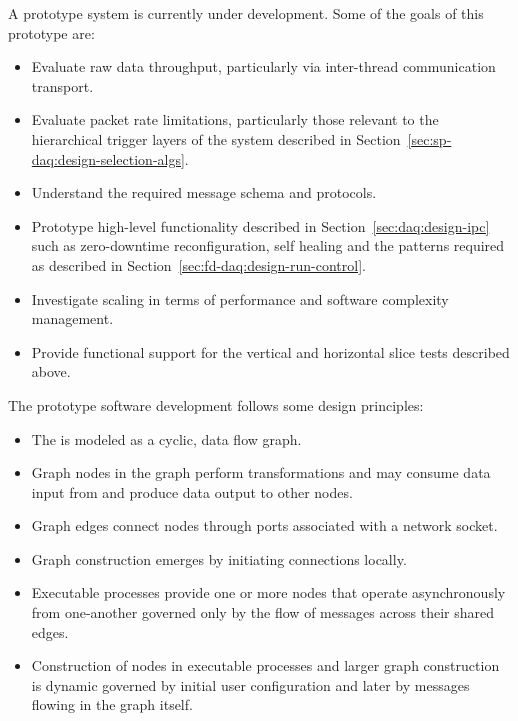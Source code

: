 

\label{sec:fd-daq:validation-demonstrators}


A prototype  system is currently under development. 
Some of the goals of this prototype are:

\begin{itemize}
\item Evaluate raw data throughput, particularly via inter-thread communication transport.
\item Evaluate packet rate limitations, particularly those relevant to the hierarchical trigger layers of the  system described in Section~\ref{sec:sp-daq:design-selection-algs}.
\item Understand the required message schema and protocols.
\item Prototype high-level functionality described in Section~\ref{sec:daq:design-ipc} such as zero-downtime reconfiguration, self healing and the patterns required  as described in Section~\ref{sec:fd-daq:design-run-control}.
\item Investigate scaling in terms of performance and software complexity management.
\item Provide functional support for the vertical and horizontal slice tests described above.
\end{itemize}

The prototype software development follows some design principles:

\begin{itemize}
\item The  is modeled as a cyclic, data flow graph.
\item Graph nodes in the graph perform transformations and may consume data input from and produce data output to other nodes.
\item Graph edges connect nodes through ports associated with a network socket.
\item Graph construction emerges by initiating connections locally.
\item Executable processes provide one or more nodes that operate asynchronously from one-another governed only by the flow of messages across their shared edges.
\item Construction of nodes in executable processes and larger graph construction is dynamic governed by initial user configuration and later by messages flowing in the graph itself.
\end{itemize}

